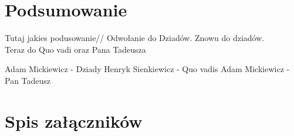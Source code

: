\documentclass[12pt,a4paper]{report}
\begin{document}
\chapter*{Podsumowanie}
Tutaj jakies podusowanie//
Odwołanie do \cite{01}Dziadów. Znowu do \cite{01}dziadów.\\
Teraz do \cite{02} Quo vadi oraz \cite{03} Pana Tadeusza


\newpage
\begin{thebibliography}{99}
    Adam Mickiewicz - Dziady
    Henryk Sienkiewicz - Quo vadis
    Adam Mickiewicz - Pan Tadeusz
\end{thebibliography}
\newpage
\listoffigures
\newpage
\listoftables
\newpage
\chapter*{Spis załączników}
\end{document}
